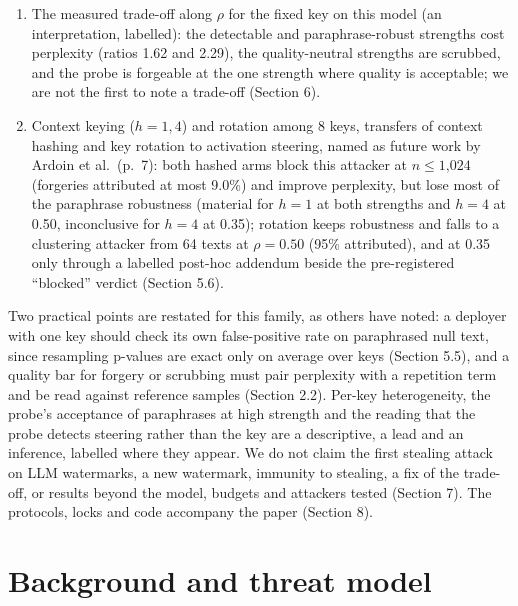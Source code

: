 \documentclass[11pt,letterpaper]{article}
\begin{document}
\begin{enumerate}
\item
  The measured trade-off along \(\rho\) for the fixed key on this model (an interpretation, labelled): the detectable and paraphrase-robust strengths cost perplexity (ratios 1.62 and 2.29), the quality-neutral strengths are scrubbed, and the probe is forgeable at the one strength where quality is acceptable; we are not the first to note a trade-off (Section 6).
\item
  Context keying (\(h = 1, 4\)) and rotation among 8 keys, transfers of context hashing \citep{kirchenbauer2023watermark, kirchenbauer2024reliability} and key rotation \citep{kirchenbauer2023watermark, pang2024nofreelunch, gu2024learnability, dathathri2024synthid} to activation steering, named as future work by Ardoin et al.~(p.~7): both hashed arms block this attacker at \(n \leq \text{1,024}\) (forgeries attributed at most 9.0\%) and improve perplexity, but lose most of the paraphrase robustness (material for \(h = 1\) at both strengths and \(h = 4\) at 0.50, inconclusive for \(h = 4\) at 0.35); rotation keeps robustness and falls to a clustering attacker from 64 texts at \(\rho = 0.50\) (95\% attributed), and at 0.35 only through a labelled post-hoc addendum beside the pre-registered ``blocked'' verdict (Section 5.6).
\end{enumerate}

Two practical points are restated for this family, as others have noted: a deployer with one key should check its own false-positive rate on paraphrased null text, since resampling p-values are exact only on average over keys (Section 5.5), and a quality bar for forgery or scrubbing must pair perplexity with a repetition term and be read against reference samples (Section 2.2). Per-key heterogeneity, the probe's acceptance of paraphrases at high strength and the reading that the probe detects steering rather than the key are a descriptive, a lead and an inference, labelled where they appear. We do not claim the first stealing attack on LLM watermarks, a new watermark, immunity to stealing, a fix of the trade-off, or results beyond the model, budgets and attackers tested (Section 7). The protocols, locks and code accompany the paper (Section 8).

\hypertarget{background-and-threat-model}{%
\section{Background and threat model}\label{background-and-threat-model}}
\end{document}
